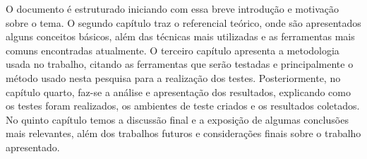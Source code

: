 O documento é estruturado iniciando com essa breve introdução e motivação sobre o tema. O segundo capítulo traz o referencial teórico, onde são apresentados alguns conceitos básicos, além das técnicas mais utilizadas e as ferramentas mais comuns encontradas atualmente. O terceiro capítulo apresenta a metodologia usada no trabalho, citando as ferramentas que serão testadas e principalmente o método usado nesta pesquisa para a realização dos testes. Posteriormente, no capítulo quarto, faz-se a análise e apresentação dos resultados, explicando como os testes foram realizados, os ambientes de teste criados e os resultados coletados. No quinto capítulo temos a discussão final e a exposição de algumas conclusões mais relevantes, além dos trabalhos futuros e considerações finais sobre o trabalho apresentado.

